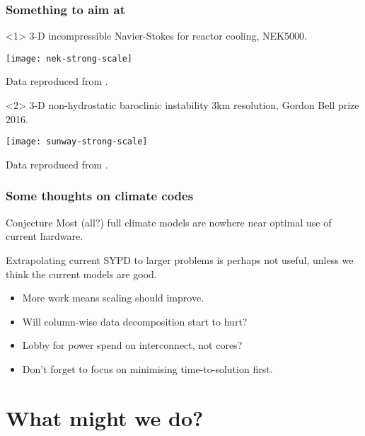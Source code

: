 \documentclass[presentation]{beamer}
\begin{document}
\begin{frame}
  \frametitle{Something to aim at}

  \begin{onlyenv}<1>
    3-D incompressible Navier-Stokes for reactor cooling, NEK5000.

    \begin{center}
      \texttt{[image: nek-strong-scale]}

      Data reproduced from \textcite{Fischer:2015}.
    \end{center}
  \end{onlyenv}

  \begin{onlyenv}<2>
    3-D non-hydrostatic baroclinic instability 3km resolution, Gordon Bell prize
    2016.
    \begin{center}
      \texttt{[image: sunway-strong-scale]}

      Data reproduced from \textcite{Yang:2016}.
    \end{center}
  \end{onlyenv}
\end{frame}

\begin{frame}
  \frametitle{Some thoughts on climate codes}

  \begin{block}{Conjecture}
    Most (all?) full climate models are nowhere near optimal use of current
    hardware.

    Extrapolating current SYPD to larger problems is perhaps not
    useful, unless we think the current models are good.
  \end{block}

  \begin{itemize}
  \item More work means scaling should improve.
  \item Will column-wise data decomposition start to hurt?
  \item Lobby for power spend on interconnect, not cores?
  \item Don't forget to focus on minimising time-to-solution first.
  \end{itemize}
\end{frame}

\section{What might we do?}
\end{document}
